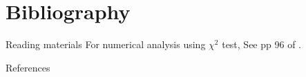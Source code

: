 \documentclass[11pt,ignorenonframetext,aspectratio=169]{beamer}
\newif\ifbibliography
\begin{document}
\hypertarget{bibliography}{%
\section{Bibliography}\label{bibliography}}

\begin{frame}{Reading materials}
\protect\hypertarget{reading-materials}{}
For numerical analysis using \(\chi^2\) test, See pp 96 of
\textcite{griffiths2015introduction}.
\end{frame}

\begin{frame}{References}
\protect\hypertarget{references}{}
\end{frame}


  \begin{frame}[allowframebreaks]{}
  \bibliographytrue
  \printbibliography[heading=none]
  \end{frame}
\end{document}
